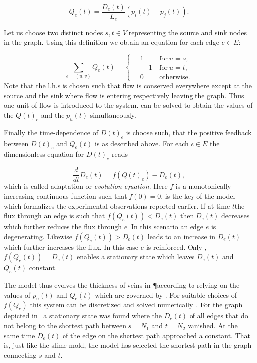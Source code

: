 	\begin{equation}
		Q_e(t) = \frac{D_e(t)}{L_e} (p_i(t) - p_j(t)).
		\label{eq:flow}
	\end{equation}

	Let us choose two distinct nodes $s, t \in V$ representing the source and sink nodes in the graph. Using this definition we obtain an equation for each edge $e \in E$:

	\begin{equation}
		\sum_{e = (u,v) } Q_e(t) =
		\begin{cases}
		\quad 1 & \ \text{for} \ u=s, \\
		\quad -1 & \ \text{for} \ u=t, \\
		\quad 0 & \ \text{otherwise}.
		\end{cases}
		\label{eq:conservation_of_flow}
	\end{equation}
	Note that the l.h.s is chosen such that flow is conserved everywhere except at the source and the sink where flow is entering respectively leaving the graph. Thus one unit of flow is introduced to the system.  can be solved to obtain the values of the $Q(t)_e$ and the $p_u(t)$ simultaneously.

	Finally the time-dependence of $D(t)_e$ is choose such, that the positive feedback between $D(t)_e$ and $Q_e(t)$ is as described above. For each $e \in E$ the dimensionless equation for $D(t)_e$ reads

	\begin{equation}
		\frac{d}{dt} D_e(t) = f( Q(t)_e ) - D_e(t),
		\label{eq:evolution}
	\end{equation}
	which is called adaptation or \emph{evolution equation}. Here $f$ is a monotonically increasing continuous function such that $f(0) = 0$.  is the key of the model which formalizes the experimental observations reported earlier. If at time $t$the flux through an edge is such that $f(Q_e(t)) < D_e(t)$ then $D_e(t)$ decreases which further reduces the flux through $e$. In this scenario an edge $e$ is degenerating. Likewise $f(Q_e(t)) > D_e(t)$ leads to an increase in $D_e(t)$ which further increases the flux. In this case $e$ is reinforced. Only ,$f(Q_e(t)) = D_e(t)$ enables a stationary state which leaves $D_e(t)$ and $Q_e(t)$ constant. 

	The model thus evolves the thickness of veins in \P according to  relying on the values of $p_u(t)$ and $Q_e(t)$ which are governed by . For suitable choices of $f(Q_e)$ this system can be discretized and solved numerically~\cite{Tero2006115}. For the graph depicted in~ a stationary state was found where the $D_e(t)$ of all edges that do not belong to the shortest path between $s=N_1$ and $t=N_2$ vanished. At the same time $D_e(t)$ of the edge on the shortest path approached a constant. That is, just like the slime mold, the model has selected the shortest path in the graph connecting $s$ and $t$. 

